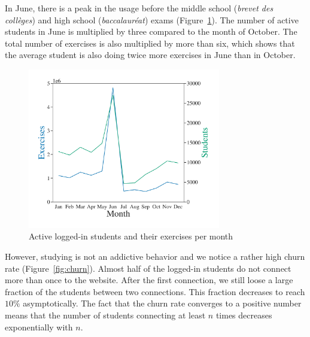 In June, there is a peak in the usage before the middle school (\emph{brevet des collèges}) and high school (\emph{baccalaur\'eat}) exams (Figure~\ref{fig:usage}). The number of active students in June is multiplied by three compared to the month of October. The total number of exercises is also multiplied by more than six, which shows that the average student is also doing twice more exercises in June than in October.  

\begin{figure}[!ht]
\centering
\includegraphics[clip, width= 0.75\textwidth]{1literature/fig/student-exercise.pdf}
\caption{Active logged-in students and their exercises per month} %
\label{fig:usage}
\end{figure}

However, studying is not an addictive behavior and we notice a rather high churn rate (Figure~\ref{fig:churn}). Almost half of the logged-in students do not connect more than once to the website. After the first connection, we still loose a large fraction of the students between two connections. This fraction decreases to reach $10\%$ asymptotically. The fact that the churn rate converges to a positive number means that the number of students connecting at least $n$ times decreases exponentially with $n$. 

